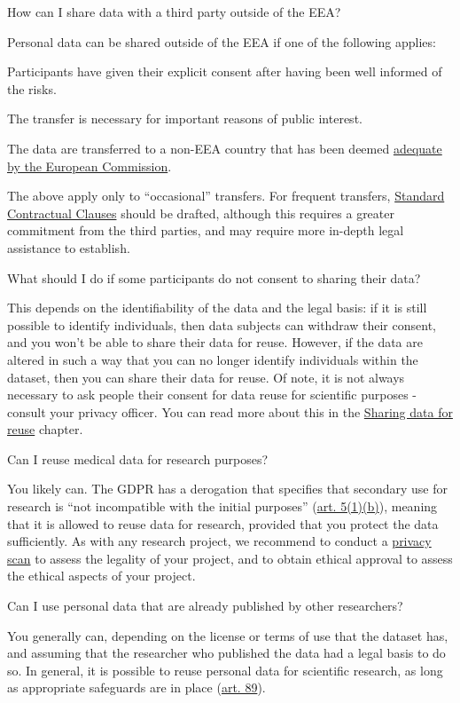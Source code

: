 \documentclass[
]{book}
\begin{document}
How can I share data with a third party outside of the EEA?

Personal data can be shared outside of the EEA if one of the following applies:

Participants have given their explicit consent after having been well informed of the risks.

The transfer is necessary for important reasons of public interest.

The data are transferred to a non-EEA country that has been deemed \href{https://ec.europa.eu/info/law/law-topic/data-protection/international-dimension-data-protection/adequacy-decisions_en}{adequate by the European Commission}.

The above apply only to ``occasional'' transfers. For frequent transfers, \protect\hyperlink{scc}{Standard Contractual Clauses} should be drafted, although this requires a greater commitment from the third parties, and may require more in-depth legal assistance to establish.

What should I do if some participants do not consent to sharing their data?

This depends on the identifiability of the data and the legal basis: if it is still possible to identify individuals, then data subjects can withdraw their consent, and you won't be able to share their data for reuse. However, if the data are altered in such a way that you can no longer identify individuals within the dataset, then you can share their data for reuse. Of note, it is not always necessary to ask people their consent for data reuse for scientific purposes - consult your privacy officer. You can read more about this in the \protect\hyperlink{data-sharing-reuse}{Sharing data for reuse} chapter.

Can I reuse medical data for research purposes?

You likely can. The GDPR has a derogation that specifies that secondary use for research is ``not incompatible with the initial purposes'' (\href{https://gdpr-info.eu/art-5-gdpr/}{art. 5(1)(b)}), meaning that it is allowed to reuse data for research, provided that you protect the data sufficiently. As with any research project, we recommend to conduct a \protect\hyperlink{privacy-scan}{privacy scan} to assess the legality of your project, and to obtain ethical approval to assess the ethical aspects of your project.

Can I use personal data that are already published by other researchers?

You generally can, depending on the license or terms of use that the dataset has, and assuming that the researcher who published the data had a legal basis to do so. In general, it is possible to reuse personal data for scientific research, as long as appropriate safeguards are in place (\href{https://gdpr-info.eu/art-89-gdpr/}{art. 89}).
\end{document}
